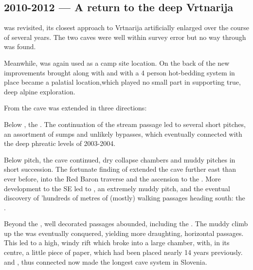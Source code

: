 \subsection{2010-2012 --- A return to the deep Vrtnarija} 
 was revisited, its closest approach to Vrtnarija artificially enlarged over the course of several years. The two caves were well within survey error but no way through was found. 

Meanwhile,  was again used as a camp site location. On the back of the new improvements brought along with  and with a 4 person hot-bedding system in place  became a palatial location,which played no small part in supporting true, deep alpine exploration.

From  the cave was extended in three directions:
\begin{citemize}
\item Below , the . The continuation of the stream passage led to several short pitches, an assortment of sumps and unlikely bypasses, which eventually connected with the deep phreatic levels of 2003-2004.
\item Below  pitch, the cave continued, dry collapse chambers and muddy pitches in short succession. The fortunate finding of  extended the cave further east than ever before, into the Red Baron traverse and the ascension to the . More development to the SE led to , an extremely muddy pitch, and the eventual discovery of 'hundreds of metres of (mostly) walking passages heading south: the .
\item Beyond the , well decorated passages abounded, including the . The muddy climb up the  was eventually conquered, yielding more draughting, horizontal passages. This led to a high, windy rift which broke into a large chamber, with, in its centre, a little piece of paper, which had been placed nearly 14 years previously.  and , thus connected now made the longest cave system in Slovenia.
\end{citemize}


